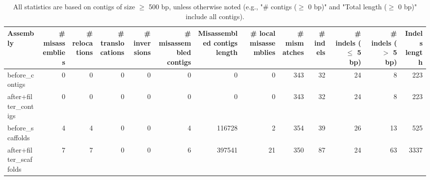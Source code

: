 \documentclass[12pt,a4paper]{article}
\begin{document}
\begin{table}[ht]
\begin{center}
\caption{All statistics are based on contigs of size $\geq$ 500 bp, unless otherwise noted (e.g., "\# contigs ($\geq$ 0 bp)" and "Total length ($\geq$ 0 bp)" include all contigs).}
\begin{tabular}{|l*{12}{|r}|}
\hline
Assembly & \# misassemblies &     \# relocations &     \# translocations &     \# inversions & \# misassembled contigs & Misassembled contigs length & \# local misassemblies & \# mismatches & \# indels &     \# indels ($\leq$ 5 bp) &     \# indels ($>$ 5 bp) & Indels length \\ \hline
before\_contigs & 0 & 0 & 0 & 0 & 0 & 0 & 0 & 343 & 32 & 24 & 8 & 223 \\ \hline
after+filter\_contigs & 0 & 0 & 0 & 0 & 0 & 0 & 0 & 343 & 32 & 24 & 8 & 223 \\ \hline
before\_scaffolds & 4 & 4 & 0 & 0 & 4 & 116728 & 2 & 354 & 39 & 26 & 13 & 525 \\ \hline
after+filter\_scaffolds & 7 & 7 & 0 & 0 & 6 & 397541 & 21 & 350 & 87 & 24 & 63 & 3337 \\ \hline
\end{tabular}
\end{center}
\end{table}
\end{document}
